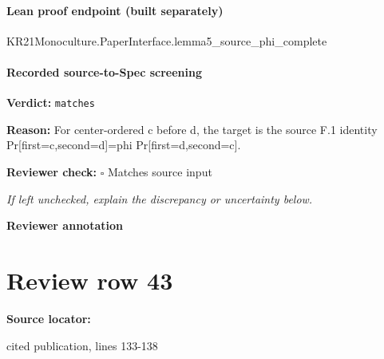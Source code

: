 \documentclass[10pt]{article}
\newcommand{\reviewerbox}{%
  \par\noindent\fbox{\parbox{0.96\linewidth}{\rule{0pt}{0.38in}}}\par
}
\newcommand{\reviewmatch}[1]{%
  \par\noindent\textbf{Reviewer check:} $\square$\; #1\par
  \noindent\emph{If left unchecked, explain the discrepancy or uncertainty below.}\par
}
\begin{document}
\paragraph{Lean proof endpoint (built separately)}\begin{ReviewVerbatim}
KR21Monoculture.PaperInterface.lemma5_source_phi_complete
\end{ReviewVerbatim}

\paragraph{Recorded source-to-Spec screening}
\textbf{Verdict:} \texttt{matches}
\\
{\raggedright
\textbf{Reason:} For center-\allowbreak{}ordered c before d, the target is the source F.\allowbreak{}1 identity Pr[first=c,second=d]=phi Pr[first=d,second=c].\allowbreak{}
\par}
\reviewmatch{Matches source input}
\noindent\textbf{Reviewer annotation}\par
\reviewerbox
\clearpage
\hypertarget{source-claim-7ef5e5254a6c73ab}{}
\section*{Review row 43}
\textbf{Source locator:} {\footnotesize\raggedright cited publication, lines 133-\allowbreak{}138\par}
\end{document}

